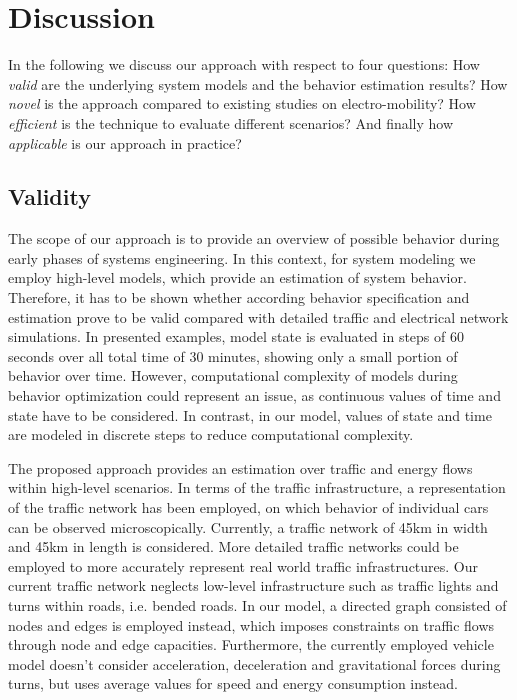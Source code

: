 \section{Discussion}
\label{section:discussion}

In the following we discuss our approach with respect to four questions: How \textit{valid} are the underlying system models and the behavior estimation results? How \textit{novel} is the approach compared to existing studies on electro-mobility? How \textit{efficient} is the technique to evaluate different scenarios? And finally how \textit{applicable} is our approach in practice?

\subsection{Validity}

The scope of our approach is to provide an overview of possible behavior during early phases of systems engineering. In this context, for system modeling we employ high-level models, which provide an estimation of system behavior. Therefore, it has to be shown whether according behavior specification and estimation prove to be valid compared with detailed traffic and electrical network simulations. In presented examples, model state is evaluated in steps of 60 seconds over all total time of 30 minutes, showing only a small portion of behavior over time. However, computational complexity of models during behavior optimization could represent an issue, as continuous values of time and state have to be considered. In contrast, in our model, values of state and time are modeled in discrete steps to reduce computational complexity.

The proposed approach provides an estimation over traffic and energy flows within high-level scenarios. In terms of the traffic infrastructure, a representation of the traffic network has been employed, on which behavior of individual cars can be observed microscopically. Currently, a traffic network of 45km in width and 45km in length is considered. More detailed traffic networks could be employed to more accurately represent real world traffic infrastructures. Our current traffic network neglects low-level infrastructure such as traffic lights and turns within roads, i.e. bended roads. In our model, a directed graph consisted of nodes and edges is employed instead, which imposes constraints on traffic flows through node and edge capacities. Furthermore, the currently employed vehicle model doesn't consider acceleration, deceleration and gravitational forces during turns, but uses average values for speed and energy consumption instead.

